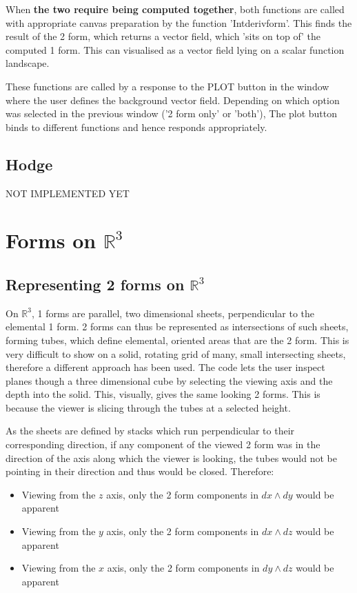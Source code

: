 \documentclass[11]{report}
\begin{document}
When \textbf{the two require being computed together}, both functions are called with appropriate canvas preparation by the function 'Int\textunderscore deriv\textunderscore form'. This finds the result of the 2 form, which returns a vector field, which 'sits on top of' the computed 1 form. This can visualised as a vector field lying on a scalar function landscape.

\noindent These functions are called by a response to the PLOT button in the window where the user defines the background vector field. Depending on which option was selected in the previous window ('2 form only' or 'both'), The plot button binds to different functions and hence responds appropriately.

\subsection{Hodge}


NOT IMPLEMENTED YET



\section{Forms on $\mathbb{R}^{3}$}
\subsection{Representing 2 forms on $\mathbb{R}^{3}$}
On $\mathbb{R}^{3}$, 1 forms are parallel, two dimensional sheets, perpendicular to the elemental 1 form. 2 forms can thus be represented as intersections of such sheets, forming tubes, which define elemental, oriented areas that are the 2 form. This is very difficult to show on a solid, rotating grid of many, small intersecting sheets, therefore a different approach has been used. The code lets the user inspect planes though a three dimensional cube by selecting the viewing axis and the depth into the solid.
This, visually, gives the same looking 2 forms. This is because the viewer is slicing through the tubes at a selected height.

As the sheets are defined by stacks which run perpendicular to their corresponding direction, if any component of the viewed 2 form was in the direction of the axis along which the viewer is looking, the tubes would not be pointing in their direction and thus would be closed. Therefore:
\begin{itemize}
	\item Viewing from the $z$ axis, only the 2 form components in $dx\wedge dy$ would be apparent
	\item Viewing from the $y$ axis, only the 2 form components in $dx\wedge dz$ would be apparent
	\item Viewing from the $x$ axis, only the 2 form components in $dy\wedge dz$ would be apparent
\end{itemize} 
\end{document}
